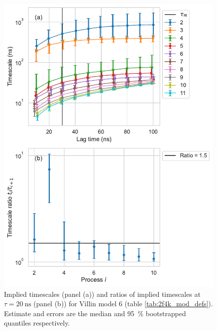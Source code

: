 \documentclass{article}
\begin{document}
\begin{figure}
    \centering
    \includegraphics[height=0.65\textheight]{figures/its/villin/Villin_model_logit(dist.)_method_m2.pdf}
    \caption{Implied timescales (panel (a)) and ratios of implied timescales at $\tau=\SI{20}{\nano\second}$ (panel (b)) for Villin model 6 (table \ref{tab:2f4k_mod_defs}). Estimate and errors are the median and \SI{95}{\percent} bootstrapped quantiles respectively.}
    \label{fig:its_villin_6}
\end{figure}
\end{document}
